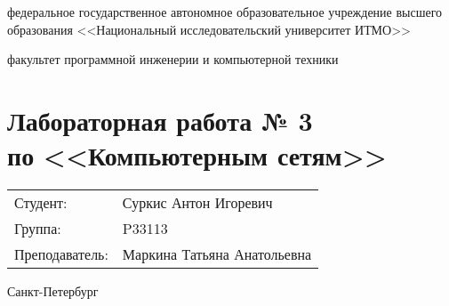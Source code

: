 \begin{titlepage}
    \begin{center}
        федеральное государственное автономное образовательное учреждение высшего образования
        <<Национальный исследовательский университет ИТМО>>

        \bigskip

        факультет программной инженерии и компьютерной техники

        \vfill

        \section*{Лабораторная работа № 3 \\
        по <<Компьютерным сетям>>}

        \bigskip

        \begin{flushright}
            \begin{tabular}{ll}
                Студент: & Суркис Антон Игоревич \\
                Группа: & P33113 \\
                Преподаватель: & Маркина Татьяна Анатольевна \\
            \end{tabular}
        \end{flushright}

        \vfill

        Санкт-Петербург

        \the\year
    \end{center}
\end{titlepage}

